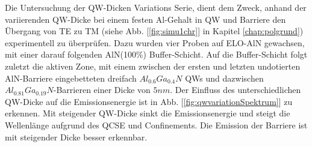 Die Untersuchung der QW-Dicken Variations Serie, dient dem Zweck, anhand der variierenden QW-Dicke bei einem festen Al-Gehalt in QW und Barriere den \"Ubergang von TE zu TM (siehe Abb. [\ref{fig:simu1chr}] in Kapitel \ref{chap:polgrund}) experimentell zu \"uberpr\"ufen. Dazu wurden vier Proben auf ELO-AlN gewachsen, mit einer darauf folgenden AlN(100\%) Buffer-Schicht. Auf die Buffer-Schicht folgt zuletzt die aktiven Zone, mit einem zwischen der ersten und letzten undotierten AlN-Barriere eingebetteten dreifach $Al_{0.6}Ga_{0.4}N$ QWs und dazwischen $Al_{0.81}Ga_{0.19}N$-Barrieren einer Dicke von $5nm$. 
Der Einfluss des unterschiedlichen QW-Dicke auf die Emissionsenergie ist in Abb. [\ref{fig:qwvariationSpektrum}] zu erkennen. Mit steigender QW-Dicke sinkt die Emissionsenergie und steigt die Wellenl\"ange aufgrund des QCSE und Confinements. Die Emission der Barriere ist mit steigender Dicke besser erkennbar. 
%
